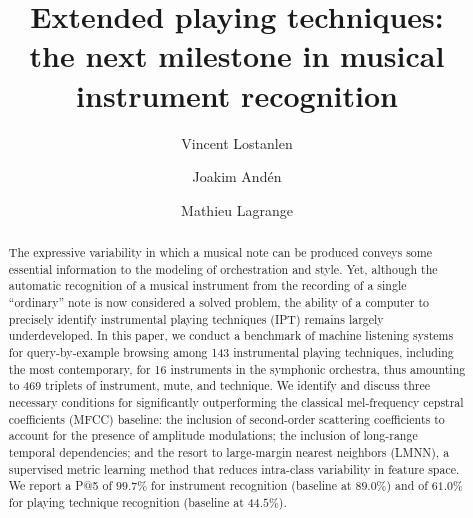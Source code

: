 \documentclass[sigconf, authordraft]{acmart}
\begin{document}
\title{Extended playing techniques:\\ the next milestone in musical instrument recognition}

\author{Vincent Lostanlen}

\author{Joakim And\'{e}n}

\author{Mathieu Lagrange}

\renewcommand{\shortauthors}{V. Lostanlen et al.}


\begin{abstract}
The expressive variability in which a musical note can be produced conveys some essential information to the modeling of orchestration and style. Yet, although the automatic recognition of a musical instrument from the recording of a single ``ordinary'' note is now considered a solved problem, the ability of a computer to precisely identify instrumental playing techniques (IPT) remains largely underdeveloped.
In this paper, we conduct a benchmark of machine listening systems for query-by-example browsing among 143 instrumental playing techniques, including the most contemporary, for 16 instruments in the symphonic orchestra, thus amounting to 469 triplets of instrument, mute, and technique. We identify and discuss three necessary conditions for significantly outperforming the classical mel-frequency cepstral coefficients (MFCC) baseline: the inclusion of second-order scattering coefficients to account for the presence of amplitude modulations; the inclusion of long-range temporal dependencies; and the resort to large-margin nearest neighbors (LMNN), a supervised metric learning method that reduces intra-class variability in feature space.
We report a P@5 of $99.7\%$ for instrument recognition (baseline at $89.0\%$) and of $61.0\%$ for playing technique recognition (baseline at $44.5\%$).
\end{abstract}
\end{document}
